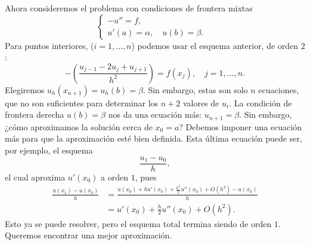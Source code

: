 \documentclass[11pt,letterpaper]{report}
\begin{document}
Ahora consideremos el problema con condiciones de frontera mixtas
\begin{equation}
  \left\{
    \begin{aligned}
      -u'' = f,&
      \\
      u'(a)=\alpha,\quad u(b)=\beta.&
    \end{aligned}
  \right.
\end{equation}
Para puntos interiores, ($i=1,\dots,n$) podemos usar el esquema
anterior, de orden $2$:
\begin{equation}
  - \left( \frac{u_{j-1}-2u_j+u_{j+1}}{h^{2}} \right)
    =
    f(x_j), \quad j=1,\dots,n
.\end{equation}
Elegiremos $u_h(x_{n+1})=u_h(b)=\beta$. Sin embargo, estas son solo
$n$ ecuaciones, que no son suficientes para determinar los $n+2$
valores de $u_i$. La condición de frontera derecha $u(b)=\beta$ nos da
una ecuación más: $u_{n+1}=\beta$. Sin embargo,
¿cómo aproximamos la solución cerca de $x_0=a$? Debemos imponer
una ecuación más para que la aproximación esté bien definida.
Esta última ecuación puede ser, por ejemplo, el esquema
\begin{equation}
  \frac{u_1-u_0}{h},
\end{equation}
el cual aproxima $u'(x_0)$ a orden $1$, pues
\begin{align}
  \frac{u(x_1)-u(x_0)}{h}
  &=
  \frac{
    u(x_0)
    +hu'(x_0)
    +\frac{h^{2}}{2}u''(x_0)
    +O(h^{3})
    -u(x_0)
  }{h} \\
  &=
    u'(x_0)
    +\frac{h}{2}u''(x_0)
    +O(h^{2})
.\end{align}
Esto ya se puede resolver, pero el esquema total termina siendo de
orden $1$. Queremos encontrar una mejor aproximación.
\end{document}
